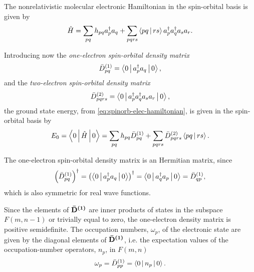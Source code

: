 The nonrelativistic molecular electronic Hamiltonian in the 
spin-orbital basis is given by 
\begin{equation} \label{eq:spinorb-elec-hamiltonian}
    \hat{H} =
    \sum_{pq}  h_{pq} a_p^{\dagger} a_q +
    \sum_{pqrs} \Braket{pq | rs} a_p^{\dagger} a_q^{\dagger} a_s a_r
    .
\end{equation}

Introducing now the \textit{one-electron spin-orbital density matrix}
\begin{equation}
    \oedmso_{pq} =
    \Braket{0 | a_p^{\dagger} a_q | 0}
    ,
\end{equation}
and the \textit{two-electron spin-orbital density matrix}
\begin{equation}
    \tedmso_{pqrs} = \Braket{0 | a_p^{\dagger} a_q^{\dagger} a_s a_r | 0}
    ,
\end{equation}
the ground state energy, from \cref{eq:spinorb-elec-hamiltonian}, is given in
the spin-orbital basis by
\begin{equation}
    E_0 =
    \Braket{0 | \hat{H} | 0} =
    \sum_{pq}  h_{pq} \oedmso_{pq} +
    \sum_{pqrs} \tedmso_{pqrs} \Braket{pq | rs}
    .
\end{equation}

The one-electron spin-orbital density matrix is an Hermitian matrix, since 
\begin{equation}
    \left( \oedmso_{pq} \right)^{\dagger} =
    \left( \Braket{0 | a_p^{\dagger} a_q | 0} \right)^{\dagger} =
    \Braket{0 | a_q^{\dagger} a_p | 0} = 
    \oedmso_{qp}
    ,
\end{equation}
which is also symmetric for real wave functions.

Since the elements of $ \boldsymbol{\mathrm{\bar{D}^{\left( 1 \right)}}}$ are inner products of 
states in the subspace $F\left( m, n-1 \right)$ or trivially equal to zero, 
the one-electron density matrix is positive semidefinite.
The occupation numbers, $\omega_p$, of the electronic state are given by the
diagonal elements of $ \boldsymbol{\mathrm{\bar{D}^{\left( 1 \right)}}}$, i.e. the expectation values of the 
occupation-number operators, $n_p$, in $F\left( m,n \right)$
\begin{equation}
    \omega_p = \oedmso_{pp} = \Braket{0 | n_p | 0}
    .
\end{equation}

